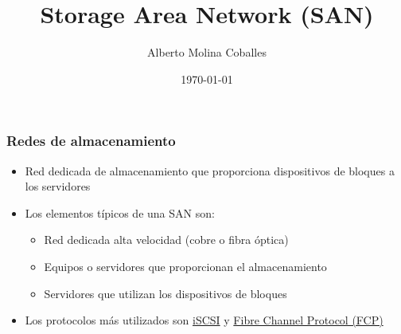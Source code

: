 \documentclass[aspectratio=169]{beamer}
\author{Alberto Molina Coballes}
\title{Storage Area Network (SAN)}
\institute{IES Gonzalo Nazareno}
\date{\today}
\begin{document}
\def\braces#1{[#1]}

\begin{frame}[t,plain]
\titlepage
\end{frame}

\begin{frame}
  \frametitle{Redes de almacenamiento}
  \begin{itemize}
  \item Red dedicada de almacenamiento que proporciona dispositivos de
    bloques a los servidores
  \item Los elementos típicos de una SAN son:
    \begin{itemize}
    \item Red dedicada alta velocidad (cobre o fibra óptica)
    \item Equipos o servidores que proporcionan el almacenamiento
    \item Servidores que utilizan los dispositivos de bloques
    \end{itemize}
    \item Los protocolos más utilizados son
      \href{https://en.wikipedia.org/wiki/ISCSI}{iSCSI} y
      \href{https://en.wikipedia.org/wiki/Fibre\_Channel\_Protocol}{Fibre
        Channel Protocol (FCP)}
  \end{itemize}
\end{frame}
\end{document}

